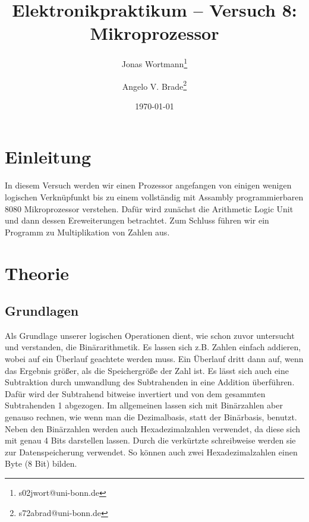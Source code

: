 \documentclass[10pt]{article}
\title{Elektronikpraktikum -- Versuch 8: Mikroprozessor}
\author[1]{Jonas Wortmann\thanks{s02jwort@uni-bonn.de}}
\author[1]{Angelo V. Brade\thanks{s72abrad@uni-bonn.de}}
\affil[1]{Rheinische Friedrich-Wilhelms-Universität Bonn}
\date{\today}
\begin{document}
\maketitle
\newpage

\tableofcontents
\newpage


\pagestyle{fancy}
\fancyhead[R]{\thepage}
\fancyhead[L]{\leftmark}


\begin{multicols}{2}
	\section{Einleitung}
  In diesem Versuch werden wir einen Prozessor angefangen von einigen wenigen logischen Verknüpfunkt bis zu einem vollständig mit Assambly programmierbaren 8080 Mikroprozessor verstehen. Dafür wird zunächst die Arithmetic Logic Unit und dann dessen Ereweiterungen betrachtet. Zum Schluss führen wir ein Programm zu Multiplikation von Zahlen aus.
	\section{Theorie}
  \subsection{Grundlagen}
  Als Grundlage unserer logischen Operationen dient, wie schon zuvor untersucht und verstanden, die Binärarithmetik. Es lassen sich z.B. Zahlen einfach addieren, wobei auf ein Überlauf geachtete werden muss. Ein Überlauf dritt dann auf, wenn das Ergebnis größer, als die Speichergröße der Zahl ist. Es lässt sich auch eine Subtraktion durch umwandlung des Subtrahenden in eine Addition überführen. Dafür wird der Subtrahend bitweise invertiert und von dem gesammten Subtrahenden 1 abgezogen. Im allgemeinen lassen sich mit Binärzahlen aber genauso rechnen, wie wenn man die Dezimalbasis, statt der Binärbasis, benutzt. Neben den Binärzahlen werden auch Hexadezimalzahlen verwendet, da diese sich mit genau 4 Bits darstellen lassen. Durch die verkürtzte schreibweise werden sie zur Datenspeicherung verwendet. So können auch zwei Hexadezimalzahlen einen Byte (8 Bit) bilden. 

\end{multicols}
\end{document}
